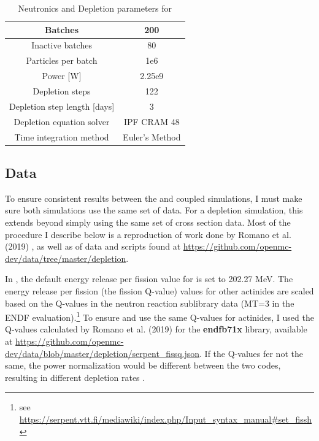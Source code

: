 \begin{table}[htpb] 
    \centering 
    \caption{Neutronics and Depletion parameters for \SaltProc}
    \label{tab:saltproc-params}
    \begin{tabular}{|c|c|} 
        \hline
        Batches & 200 \\
        \hline
        Inactive batches & 80 \\
        \hline
        Particles per batch & 1e6 \\
        \hline
        Power [W] & 2.25e9 \\
        \hline
        Depletion steps & 122 \\
        \hline
        Depletion step length [days] & 3 \\
        \hline
        Depletion equation solver & IPF CRAM 48 \\
        \hline
        Time integration method & Euler's Method \\
        \hline
    \end{tabular}
\end{table}

\subsection{Data}
\label{sub:results-xs-data}

To ensure consistent results between the \OpenMC and \SerpentTWO coupled
simulations, I must make sure both simulations use the same set of data.
For a depletion simulation, this extends beyond simply using the same set of
cross section data. Most of the procedure I describe below is a reproduction of
work done by Romano et al. (2019) \cite{romano_depletion_2021}, as well as of
data and scripts found at \url{https://github.com/openmc-dev/data/tree/master/depletion}.

In \SerpentTWO, the default energy release per fission value for 
is set to 202.27 MeV. The energy release per fission (the fission Q-value) values for other actinides
are scaled based on the Q-values in the neutron reaction sublibrary data (MT=3 in the
ENDF evaluation).\footnote{see \url{https://serpent.vtt.fi/mediawiki/index.php/Input_syntax_manual\#set_fissh}}
To ensure \OpenMC and \SerpentTWO use the same Q-values for actinides, 
I used the Q-values calculated by Romano et al. (2019) for the {\bf endfb71x} library,
available at \url{https://github.com/openmc-dev/data/blob/master/depletion/serpent_fissq.json}.
If the Q-values fer not the same, the power normalization would be different
between the two codes,
resulting in different depletion rates \cite{romano_depletion_2021}.

